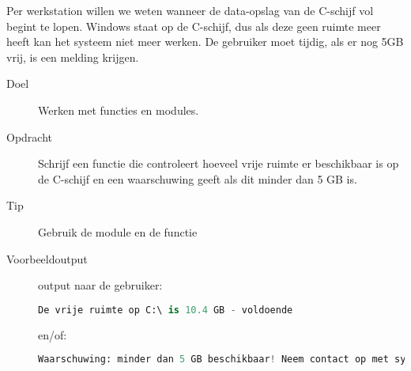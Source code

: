 Per werkstation willen we weten wanneer de data-opslag van de C-schijf vol begint te lopen. Windows staat op de C-schijf, dus als deze geen ruimte meer heeft kan het systeem niet meer werken. De gebruiker moet tijdig, als er nog 5GB vrij, is een melding krijgen.
\begin{description}
\item[Doel] Werken met functies en modules.
\item[Opdracht] Schrijf een functie  die controleert hoeveel vrije ruimte er beschikbaar is op de C-schijf en een waarschuwing geeft als dit minder dan 5 GB is.
\item[Tip] Gebruik de module  en de functie 
\item[Voorbeeldoutput] output naar de gebruiker:

\begin{lstlisting}[language=python]
De vrije ruimte op C:\ is 10.4 GB - voldoende
\end{lstlisting}

en/of:

\begin{lstlisting}[language=python]
Waarschuwing: minder dan 5 GB beschikbaar! Neem contact op met systeembeheer.
\end{lstlisting}

\end{description}

